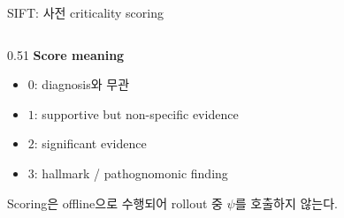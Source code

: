 \documentclass[
11pt,notheorems,hyperref={pdfauthor=whatever}
]{beamer}
\begin{document}
\begin{frame}{SIFT: 사전 criticality scoring}
\begin{columns}[T,onlytextwidth]
\begin{column}{0.51\textwidth}
\vspace{1.0em}
{\large\bfseries\textcolor{primary}{Score meaning}}

\vspace{0.25em}
{\footnotesize
\begin{itemize}
  \item \(0\): diagnosis와 무관
  \item \(1\): supportive but non-specific evidence
  \item \(2\): significant evidence
  \item \(3\): hallmark / pathognomonic finding
\end{itemize}
Scoring은 offline으로 수행되어 rollout 중 \(\psi\)를 호출하지 않는다.
}
\end{column}
\end{columns}
\end{frame}
\end{document}
